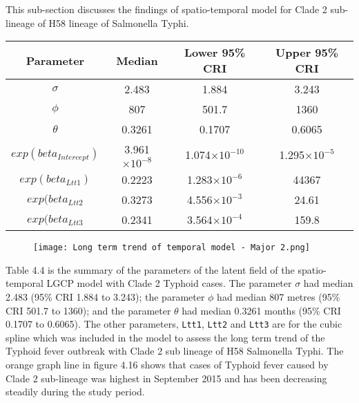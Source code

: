 \documentclass[a4paper]{thesis}
\begin{document}
This sub-section discusses the findings of spatio-temporal model for Clade 2 sub-lineage of H58 lineage of Salmonella Typhi. 

\begin{table}[h]
    \centering
     
    \begin{tabular}{cccc}
    \toprule
         Parameter & Median & Lower 95\% CRI & Upper 95\% CRI \\ \midrule
        $\sigma$ & 2.483 & 1.884 & 3.243 \\
        $\phi$ & 807 & 501.7 & 1360 \\
        $\theta$ & 0.3261 & 0.1707 & 0.6065 \\
        $exp(beta_{Intercept})$ & 3.961$\times10^{-8}$ & 1.074$\times10^{-10}$ & 1.295$\times10^{-5}$ \\
        $exp(beta_{Ltt1})$ & 0.2223 & 1.283$\times10^{-6}$ & 44367 \\
        $exp(beta_{Ltt2}$ & 0.3273 & 4.556$\times10^{-3}$ & 24.61 \\
        $exp(beta_{Ltt3}$ & 0.2341 & 3.564$\times10^{-4}$ & 159.8 \\
         \bottomrule
    \end{tabular}
\end{table}

\begin{figure}[H]
\begin{center}
\texttt{[image: Long term trend of temporal model - Major 2.png]}
\end{center}
\end{figure}

Table 4.4 is the summary of the parameters of the latent field of the spatio-temporal LGCP model with Clade 2 Typhoid cases. The parameter $\sigma$ had median 2.483 (95\% CRI 1.884 to 3.243); the parameter $\phi$ had median 807 metres (95\% CRI 501.7 to 1360); and the parameter $\theta$ had median 0.3261 months (95\% CRI 0.1707 to 0.6065). The other parameters, \verb=Ltt1=, \verb=Ltt2= and \verb=Ltt3= are for the cubic spline which was included in the model to assess the long term trend of the Typhoid fever outbreak with Clade 2 sub\- lineage of H58 Salmonella Typhi. The orange graph line in figure 4.16 shows that cases of Typhoid fever caused by Clade 2 sub-lineage was highest in September 2015 and has been decreasing steadily during the study period.
\end{document}

